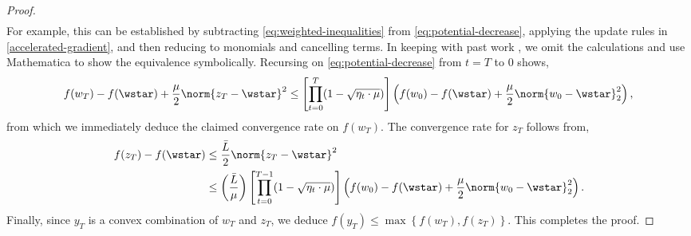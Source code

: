 \documentclass[10pt]{article} %
\newcommand{\etak}{\eta_{t}}
\newcommand{\rbr}[1]{\left(#1\right)}
\newcommand{\sbr}[1]{\left[#1\right]}
\newcommand{\cbr}[1]{\left\{#1\right\}}
\begin{document}
\begin{proof}
\begin{equation}
\begin{aligned}
        \end{aligned}
    \end{equation}
    For example, this can be established by subtracting
    \cref{eq:weighted-inequalities} from \cref{eq:potential-decrease},
    applying the update rules in \cref{accelerated-gradient}, and then
    reducing to monomials and cancelling terms.
    In keeping with past work \cite{daspremont2021acceleration}, we omit the
    calculations and use Mathematica \cite{mathematica} to show the
    equivalence symbolically. %
    Recursing on \cref{eq:potential-decrease} from \( t = T \) to \( 0 \) shows,
    \begin{equation}
        f(w_T) - f(\wstar) + \frac{\mu}{2} \norm{z_T - \wstar}^2
        \leq \sbr{\prod_{t=0}^T (1 - \sqrt{\etak \cdot \mu})} \rbr{f(w_0) - f(\wstar)
            + \frac{\mu}{2} \norm{w_0 - \wstar}_2^2},                                        \\
    \end{equation}
    from which we immediately deduce the claimed convergence rate on \( f(w_T) \).
    The convergence rate for \( z_T \) follows from,
    \begin{align*}
        f(z_T) - f(\wstar)
         & \leq \frac{\bar L}{2}\norm{z_T - \wstar}^2                                                                 \\
         & \leq \rbr{\frac{\bar L}{\mu}} \sbr{\prod_{t=0}^{T-1} (1 - \sqrt{\etak \cdot \mu})} \rbr{f(w_0) - f(\wstar)
            + \frac{\mu}{2} \norm{w_0 - \wstar}_2^2}.
    \end{align*}
    Finally, since \( y_T \) is a convex combination of \( w_T \) and \( z_T \),
    we deduce \( f(y_T) \leq \max\cbr{f(w_T), f(z_T)}  \).
    This completes the proof.
\end{proof}
\end{document}
